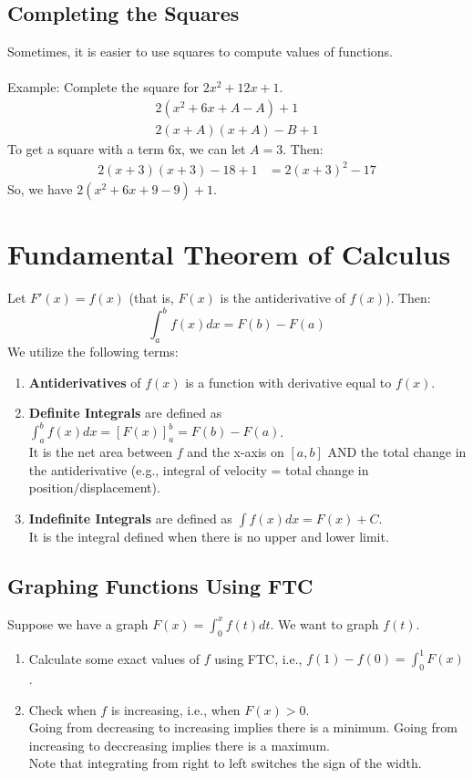 \documentclass{article}
\begin{document}
\subsection{Completing the Squares}
Sometimes, it is easier to use squares to compute values of functions.\\
\\
Example: Complete the square for $2x^2 + 12x + 1$.
\begin{align*}
    2(x^2 + 6x + A - A) + 1\\
    2(x+A)(x+A) - B +1
\end{align*}
To get a square with a term 6x, we can let $A=3$. Then:
\begin{align*}
    2(x+3)(x+3) - 18 + 1 & = 2(x+3)^2 - 17
\end{align*}
So, we have $2(x^2+6x+9-9)+1$.

\section{Fundamental Theorem of Calculus}
Let $F'(x) = f(x)$ (that is, $F(x)$ is the antiderivative of $f(x)$). Then:
$$\int_a^b f(x) dx = F(b) - F(a)$$
We utilize the following terms:
\begin{enumerate}
    \item \textbf{Antiderivatives} of $f(x)$ is a function with derivative equal to $f(x)$.
    \item \textbf{Definite Integrals} are defined as $\int_a^b f(x)dx = \left[ F(x) \right]_a^b = F(b) - F(a)$.\\
    It is the net area between $f$ and the x-axis on $[a,b]$ AND the total change in the antiderivative (e.g., integral of velocity = total change in position/displacement).
    \item \textbf{Indefinite Integrals} are defined as $\int f(x)dx = F(x) + C$.\\
    It is the integral defined when there is no upper and lower limit.
\end{enumerate}

\subsection{Graphing Functions Using FTC}
Suppose we have a graph $F(x) = \int_0^x f(t) dt$. We want to graph $f(t)$.
\begin{enumerate}
    \item Calculate some exact values of $f$ using FTC, i.e., $f(1) - f(0) = \int_0^1 F(x)$.
    \item Check when $f$ is increasing, i.e., when $F(x) > 0$.\\
    Going from decreasing to increasing implies there is a minimum. Going from increasing to deccreasing implies there is a maximum.\\
    Note that integrating from right to left switches the sign of the width.
\end{enumerate}
\end{document}
